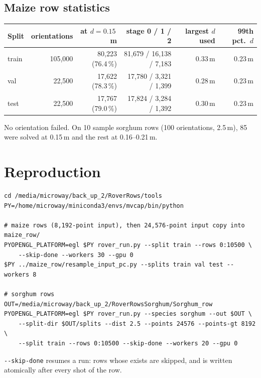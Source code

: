 \documentclass[11pt]{article}
\newcommand{\file}[1]{\path{#1}}
\begin{document}
\subsection{Maize row statistics}
\begin{center}\small
\begin{tabular}{lrrrrr}
\toprule
Split & orientations & at $d=0.15$\,m & stage 0 / 1 / 2 & largest $d$ used & 99th pct.\ $d$ \\
\midrule
train & 105{,}000 & 80{,}223 (76.4\,\%) & 81{,}679 / 16{,}138 / 7{,}183 & 0.33\,m & 0.23\,m \\
val   & 22{,}500  & 17{,}622 (78.3\,\%) & 17{,}780 / 3{,}321 / 1{,}399 & 0.28\,m & 0.23\,m \\
test  & 22{,}500  & 17{,}767 (79.0\,\%) & 17{,}824 / 3{,}284 / 1{,}392 & 0.30\,m & 0.23\,m \\
\bottomrule
\end{tabular}
\end{center}
No orientation failed. On 10 sample sorghum rows (100 orientations, 2.5\,m), 85 were solved at 0.15\,m and the rest at
0.16--0.21\,m.

\section{Reproduction}
\begin{verbatim}
cd /media/microway/back_up_2/RoverRows/tools
PY=/home/microway/miniconda3/envs/mvcap/bin/python

# maize rows (8,192-point input), then 24,576-point input copy into maize_row/
PYOPENGL_PLATFORM=egl $PY rover_run.py --split train --rows 0:10500 \
    --skip-done --workers 30 --gpu 0
$PY ../maize_row/resample_input_pc.py --splits train val test --workers 8

# sorghum rows
OUT=/media/microway/back_up_2/RoverRowsSorghum/Sorghum_row
PYOPENGL_PLATFORM=egl $PY rover_run.py --species sorghum --out $OUT \
    --split-dir $OUT/splits --dist 2.5 --points 24576 --points-gt 8192 \
    --split train --rows 0:10500 --skip-done --workers 20 --gpu 0
\end{verbatim}
\texttt{-{}-skip-done} resumes a run: rows whose \file{row.json} exists are skipped, and \file{row.json} is written
atomically after every shot of the row.

\end{document}
